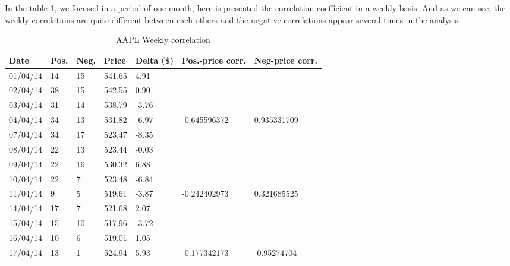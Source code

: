 In the table \ref{tab:ResultsApple}, we focused in a period of one month, here is presented the correlation coefficient in a weekly basis. And as we can see, the weekly correlations are quite different between each others and the negative correlations appear several times in the analysis.

\begin{table}\centering
	\caption{AAPL Weekly correlation}\label{tab:ResultsApple}
   	\begin{tabular}{ | p{1.8cm\textwidth} | p{1cm\textwidth} | p{1cm\textwidth} | p{1.1cm\textwidth} | p{1.1cm\textwidth} | p{2.5cm\textwidth} | p{2.5cm\textwidth} |}
   	\hline

\textbf{Date}           & \textbf{Pos.} & \textbf{Neg.} & \textbf{Price}  & \textbf{Delta (\$)} & \textbf{Pos.-price corr.} & \textbf{Neg-price corr.} \\\hline
01/04/14 & 14   & 15   & 541.65 & 4.91         &                    &                     \\\hline
02/04/14 & 38   & 15   & 542.55 & 0.90         &                    &                     \\\hline
03/04/14 & 31   & 14   & 538.79 & -3.76        &                    &                     \\\hline
04/04/14 & 34   & 13   & 531.82 & -6.97        & -0.645596372       & 0.935331709         \\\hline
07/04/14 & 34   & 17   & 523.47 & -8.35        &                    &                     \\\hline
08/04/14 & 22   & 13   & 523.44 & -0.03        &                    &                     \\\hline
09/04/14 & 22   & 16   & 530.32 & 6.88         &                    &                     \\\hline
10/04/14 & 22   & 7    & 523.48 & -6.84        &                    &                     \\\hline
11/04/14 & 9    & 5    & 519.61 & -3.87        & -0.242402973       & 0.321685525         \\\hline
14/04/14 & 17   & 7    & 521.68 & 2.07         &                    &                     \\\hline
15/04/14 & 15   & 10   & 517.96 & -3.72        &                    &                     \\\hline
16/04/14 & 10   & 6    & 519.01 & 1.05         &                    &                     \\\hline
17/04/14 & 13   & 1    & 524.94 & 5.93         & -0.177342173       & -0.95274704         \\\hline

\end{tabular}
\end{table}
